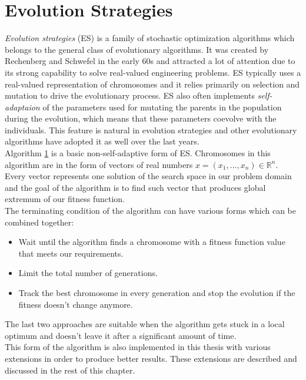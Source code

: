 \section{Evolution Strategies} \label{evolution-strategies}
\textit{Evolution strategies} (ES) is a family of stochastic optimization algorithms which belongs to the general class of evolutionary algorithms. It was created by Rechenberg and Schwefel in the early 60s and attracted a lot of attention due to its strong capability to solve real-valued engineering problems. ES typically uses a real-valued representation of chromosomes and it relies primarily on selection and mutation to drive the evolutionary process. ES also often implements \textit{self-adaptaion} of the parameters used for mutating the parents in the population during the evolution, which means that these parameters coevolve with the individuals. This feature is natural in evolution strategies and other evolutionary algorithms have adopted it as well over the last years.\\
Algorithm \ref{evolution-strategies} is a basic non-self-adaptive form of ES. Chromosomes in this algorithm are in the form of vectors of real numbers $x = (x_1,...,x_n) \in \mathbb{R}^n$. Every vector represents one solution of the search space in our problem domain and the goal of the algorithm is to find such vector that produces global extremum of our fitness function.\\
The terminating condition of the algorithm can have various forms which can be combined together:

 \begin{itemize}
    \item Wait until the algorithm finds a chromosome with a fitness function value that meets our requirements.
    \item Limit the total number of generations.
    \item Track the best chromosome in every generation and stop the evolution if the fitness doesn't change anymore.
 \end{itemize}

 The last two approaches are suitable when the algorithm gets stuck in a local optimum and doesn't leave it after a significant amount of time.\\
This form of the algorithm is also implemented in this thesis with various extensions in order to produce better results. These extensions are described and discussed in the rest of this chapter.

